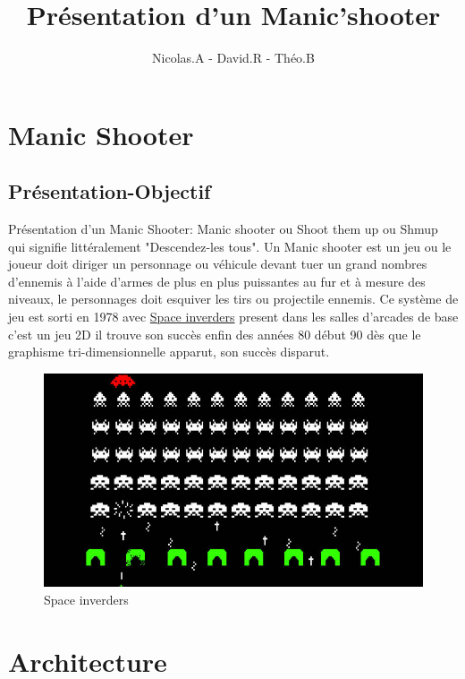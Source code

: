 \documentclass[a4paper, 11pt]{article}
\title{Présentation d'un Manic'shooter}
\author{Nicolas.A - David.R - Théo.B}
\begin{document}
\maketitle
\tableofcontents
\section{Manic Shooter}
\subsection{Présentation-Objectif}

Présentation d'un Manic Shooter:
Manic shooter ou Shoot them up ou Shmup qui signifie littéralement "Descendez-les tous".
Un Manic shooter est un jeu ou le joueur doit diriger un personnage ou véhicule devant tuer un grand nombres d'ennemis à l'aide d'armes de plus en plus puissantes au fur et à mesure des niveaux, le personnages doit esquiver les tirs ou projectile ennemis.
Ce système de jeu est sorti en 1978 avec 
\href{http://dictionnaire.sensagent.leparisien.fr/Space%20Invaders/fr-fr/}{Space inverders}
 present dans les salles d'arcades de base c'est un jeu 2D il trouve son succès enfin des années 80 début 90 dès que le graphisme tri-dimensionnelle apparut, son succès disparut.

 \begin{figure}[ht!]
 \centering
 \includegraphics[width=0.7\linewidth]{space.jpg}
 \caption{Space inverders}
 \label{fig::example::one}
\end{figure}

\section{Architecture}
\end{document}
